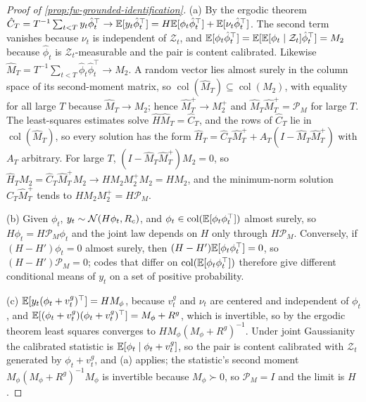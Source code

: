 \begin{proof}[Proof of \cref{prop:fw-grounded-identification}]
(a) By the ergodic theorem $\hat C_T=T^{-1}\sum_{t<T}y_t\hat\phi_t^\top\to\mathbb{E}[y_t\hat\phi_t^\top]=H\mathbb{E}[\phi_t\hat\phi_t^\top]+\mathbb{E}[\nu_t\hat\phi_t^\top]$. The second term vanishes because $\nu_t$ is independent of $\mathcal Z_t$, and $\mathbb{E}[\phi_t\hat\phi_t^\top]=\mathbb{E}[\mathbb{E}[\phi_t\mid\mathcal Z_t]\hat\phi_t^\top]=M_2$ because $\hat\phi_t$ is $\mathcal Z_t$-measurable and the pair is content calibrated. Likewise $\hat M_T=T^{-1}\sum_{t<T}\hat\phi_t\hat\phi_t^\top\to M_2$. A random vector lies almost surely in the column space of its second-moment matrix, so $\operatorname{col}(\hat M_T)\subseteq\operatorname{col}(M_2)$, with equality for all large $T$ because $\hat M_T\to M_2$; hence $\hat M_T^+\to M_2^+$ and $\hat M_T\hat M_T^+=\mathcal P_M$ for large $T$. The least-squares estimates solve $\hat H\hat M_T=\hat C_T$, and the rows of $\hat C_T$ lie in $\operatorname{col}(\hat M_T)$, so every solution has the form $\hat H_T=\hat C_T\hat M_T^++A_T(I-\hat M_T\hat M_T^+)$ with $A_T$ arbitrary. For large $T$, $(I-\hat M_T\hat M_T^+)M_2=0$, so $\hat H_TM_2=\hat C_T\hat M_T^+M_2\to HM_2M_2^+M_2=HM_2$, and the minimum-norm solution $\hat C_T\hat M_T^+$ tends to $HM_2M_2^+=H\mathcal P_M$.

(b) Given $\phi_t$, $y_t\sim\mathcal{N}(H\phi_t,R_c)$, and $\phi_t\in\operatorname{col}(\mathbb{E}[\phi_t\phi_t^\top])$ almost surely, so $H\phi_t=H\mathcal P_M\phi_t$ and the joint law depends on $H$ only through $H\mathcal P_M$. Conversely, if $(H-H')\phi_t=0$ almost surely, then $(H-H')\mathbb{E}[\phi_t\phi_t^\top]=0$, so $(H-H')\mathcal P_M=0$; codes that differ on $\operatorname{col}(\mathbb{E}[\phi_t\phi_t^\top])$ therefore give different conditional means of $y_t$ on a set of positive probability.

(c) $\mathbb{E}[y_t(\phi_t+v^g_t)^\top]=HM_\phi$, because $v^g_t$ and $\nu_t$ are centered and independent of $\phi_t$, and $\mathbb{E}[(\phi_t+v^g_t)(\phi_t+v^g_t)^\top]=M_\phi+R^g$, which is invertible, so by the ergodic theorem least squares converges to $HM_\phi(M_\phi+R^g)^{-1}$. Under joint Gaussianity the calibrated statistic is $\mathbb{E}[\phi_t\mid\phi_t+v^g_t]$, so the pair is content calibrated with $\mathcal Z_t$ generated by $\phi_t+v^g_t$, and (a) applies; the statistic's second moment $M_\phi(M_\phi+R^g)^{-1}M_\phi$ is invertible because $M_\phi\succ0$, so $\mathcal P_M=I$ and the limit is $H$.
\end{proof}

